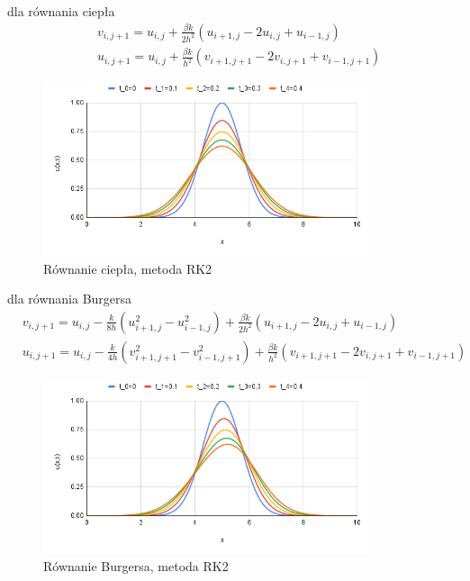 \documentclass[12pt, a4paper]{article}
\begin{document}
dla równania ciepła
\begin{equation}
\begin{split}
& v_{i,j+1}=u_{i,j}+\frac{\beta k}{2h^{2}}(u_{i+1,j}-2u_{i,j}+u_{i-1,j})\\
& u_{i,j+1}=u_{i,j}+\frac{\beta k}{h^{2}}(v_{i+1,j+1}-2v_{i,j+1}+v_{i-1,j+1})
\end{split}
\end{equation}
\begin{figure}[h]
\caption{Równanie ciepła, metoda RK2}
\centering
\includegraphics[width=0.85\textwidth]{6}
\end{figure}

dla równania Burgersa
\begin{equation}
\begin{split}
& v_{i,j+1}=u_{i,j}-\frac{k}{8h}(u_{i+1,j}^{2}-u_{i-1,j}^{2})+\frac{\beta k}{2h^{2}}(u_{i+1,j}-2u_{i,j}+u_{i-1,j})\\
& u_{i,j+1}=u_{i,j}-\frac{k}{4h}(v_{i+1,j+1}^{2}-v_{i-1,j+1}^{2})+\frac{\beta k}{h^{2}}(v_{i+1,j+1}-2v_{i,j+1}+v_{i-1,j+1})
\end{split}
\end{equation}
\begin{figure}[h]
\caption{Równanie Burgersa, metoda RK2}
\centering
\includegraphics[width=0.85\textwidth]{7}
\end{figure}
\newpage
\end{document}
